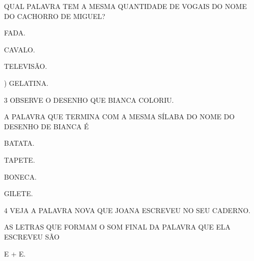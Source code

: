 \begin{escola}
{QUAL PALAVRA TEM A MESMA QUANTIDADE DE VOGAIS DO NOME DO CACHORRO DE MIGUEL?

\begin{escolha}
\item FADA.

\item CAVALO.

\item TELEVISÃO.

\item) GELATINA.
\end{escolha}


\num{3} OBSERVE O DESENHO QUE BIANCA COLORIU.




A PALAVRA QUE TERMINA COM A MESMA SÍLABA DO NOME DO DESENHO DE BIANCA É

\begin{escolha}
\item BATATA.

\item TAPETE.

\item BONECA.

\item GILETE.
\end{escolha}




\num{4} VEJA A PALAVRA NOVA QUE JOANA ESCREVEU NO SEU CADERNO.


AS LETRAS QUE FORMAM O SOM FINAL DA PALAVRA QUE ELA ESCREVEU SÃO

\begin{escolha}
\item E + E.


\end{escolha}}
\end{escola}
